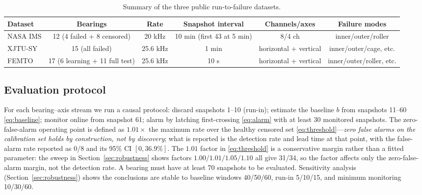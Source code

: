 \documentclass[journal]{IEEEtran}
\begin{document}
\begin{table}[!t]
\caption{Summary of the three public run-to-failure datasets.}
\label{tab:datasets}
\centering
\begin{tabular}{l c c c c c}
\toprule
Dataset & Bearings & Rate & Snapshot interval & Channels/axes & Failure modes\\
\midrule
NASA IMS & 12 (4 failed + 8 censored) & 20 kHz & 10 min (first 43 at 5 min) & 8/4 ch & inner/outer/roller\\
XJTU-SY & 15 (all failed) & 25.6 kHz & 1 min & horizontal + vertical & inner/outer/cage, etc.\\
FEMTO & 17 (6 learning + 11 full test) & 25.6 kHz & 10 s & horizontal + vertical & inner/outer/roller, etc.\\
\bottomrule
\end{tabular}
\end{table}

\subsection{Evaluation protocol}
For each bearing--axis stream we run a causal protocol: discard snapshots 1--10 (run-in); estimate the baseline $b$ from snapshots 11--60 \eqref{eq:baseline}; monitor online from snapshot 61; alarm by latching first-crossing \eqref{eq:alarm} with at least 30 monitored snapshots. The zero-false-alarm operating point is defined as $1.01\times$ the maximum rate over the healthy censored set \eqref{eq:threshold}---\emph{zero false alarms on the calibration set holds by construction, not by discovery}; what is reported is the detection rate and lead time at that point, with the false-alarm rate reported as 0/8 and its 95\% CI $[0,36.9\%]$. The $1.01$ factor in \eqref{eq:threshold} is a conservative margin rather than a fitted parameter: the sweep in Section~\ref{sec:robustness} shows factors $1.00/1.01/1.05/1.10$ all give 31/34, so the factor affects only the zero-false-alarm margin, not the detection rate. A bearing must have at least 70 snapshots to be evaluated. Sensitivity analysis (Section~\ref{sec:robustness}) shows the conclusions are stable to baseline windows 40/50/60, run-in 5/10/15, and minimum monitoring 10/30/60.
\end{document}
